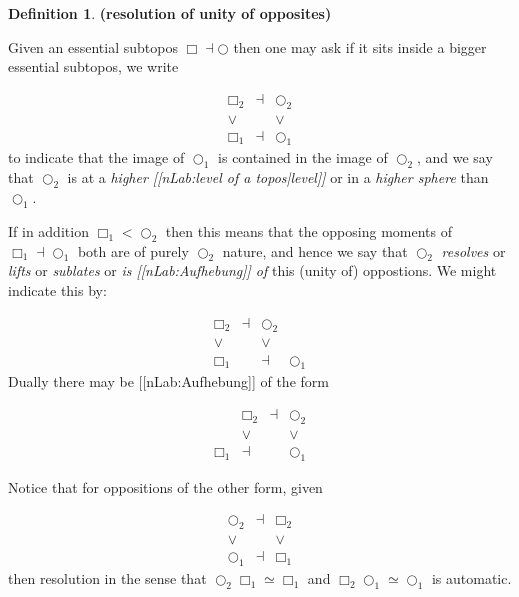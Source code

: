 \documentclass[12pt,titlepage]{article}
\newcommand{\itexarray}[1]{\begin{matrix}#1\end{matrix}}
\newcommand{\lt}{<}
\theoremstyle{plain}
\theoremstyle{definition}
\newtheorem{defn}{Definition}
\theoremstyle{remark}
\begin{document}
\begin{defn}
\label{ResolutionOfOpposition}\hypertarget{ResolutionOfOpposition}{}
\textbf{(resolution of unity of opposites)}

Given an essential subtopos $\Box \dashv \bigcirc$ then one may ask if it sits inside a bigger essential subtopos, we write

\begin{displaymath}
\itexarray{
     \Box_2 &\dashv& \bigcirc_2
     \\
     \vee && \vee
     \\
     \Box_1 &\dashv& \bigcirc_1
  }
\end{displaymath}
to indicate that the image of $\bigcirc_1$ is contained in the image of $\bigcirc_2$, and we say that $\bigcirc_2$ is at a \emph{higher [[nLab:level of a topos|level]]} or in a \emph{higher sphere} than $\bigcirc_1$.

If in addition $\Box_1 \lt \bigcirc_2$ then this means that the opposing moments of $\Box_1 \dashv \bigcirc_1$ both are of purely $\bigcirc_2$ nature, and hence we say that $\bigcirc_2$ \emph{resolves} or \emph{lifts} or \emph{sublates} or \emph{is [[nLab:Aufhebung]] of} this (unity of) oppostions. We might indicate this by:

\begin{displaymath}
\itexarray{
     \Box_2 &\dashv& \bigcirc_2
     \\
     \vee && \vee
     \\
     \Box_1 & &\dashv& \bigcirc_1
  }
\end{displaymath}
Dually there may be [[nLab:Aufhebung]] of the form

\begin{displaymath}
\itexarray{
     & \Box_2 &\dashv& \bigcirc_2
     \\
     & \vee && \vee
     \\
     \Box_1 &\dashv& & \bigcirc_1
  }
\end{displaymath}
\end{defn}
Notice that for oppositions of the other form, given

\begin{displaymath}
\itexarray{
     \bigcirc_2 &\dashv& \Box_2
     \\
     \vee && \vee
     \\
     \bigcirc_1 &\dashv& \Box_1
  }
\end{displaymath}
then resolution in the sense that $\bigcirc_2 \Box _1 \simeq \Box_1$ and $\Box_2 \bigcirc_1 \simeq \bigcirc_1$ is automatic.
\end{document}

